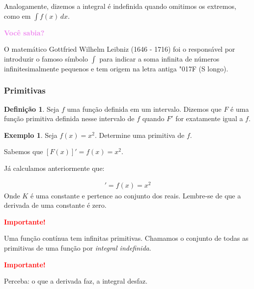 \documentclass[12pt,openright,twoside,a4paper]{article}
\theoremstyle{definition}
\newtheorem{definition}{Definição}[section]
\newtheorem{example}{Exemplo}[section]
\begin{document}
	Analogamente, dizemos a integral é indefinida quando omitimos os extremos, como em $\displaystyle \int f(x)\,dx$.
	
	\begin{snugshade}
		\textbf{\textcolor{violet}{Você sabia?}}
		
		O matemático Gottfried Wilhelm Leibniz (1646 - 1716) foi o responsável por introduzir o famoso símbolo $\int$ para indicar a soma infinita de números infinitesimalmente pequenos e tem origem na letra antiga \char"017F (S longo).
	\end{snugshade}
	
	
	
	\subsubsection{Primitivas}
		
		\begin{definition}
			Seja $f$ uma função definida em um intervalo. Dizemos que $F$ é uma função primitiva definida nesse intervalo de $f$ quando $F'$ for exatamente igual a $f$.
		\end{definition}
		
		
		\begin{example}
			Seja $f(x) = x^2$. Determine uma primitiva de $f$.
			
			Sabemos que $[F(x)]' = f(x) = x^2$.
			
			Já calculamos anteriormente que:
			
			\begin{align*}
				[\dfrac{1}{3} x^3 + K]' = f(x) = x^2
			\end{align*}
			Onde $K$ é uma constante e pertence ao conjunto dos reais. Lembre-se de que a derivada de uma constante é zero.
			
		\end{example}
		
		\begin{snugshade}
			\textbf{\textcolor{red}{Importante!}}
			
			Uma função contínua tem infinitas primitivas. Chamamos o conjunto de todas as primitivas de uma função por \textit{integral indefinida}.
			
			\textbf{\textcolor{red}{Importante!}}
			
			Perceba: o que a derivada faz, a integral desfaz.
		\end{snugshade}
		
		
		\renewcommand{\arraystretch}{2}
		
\end{document}
